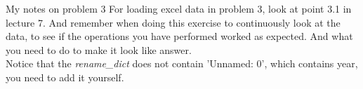 \documentclass[10pt,danish,t,10pt]{beamer}
\newcommand{\code}[1]{\textit{#1}} %
\begin{document}
\begin{frame}{My notes on problem 3}
    For loading excel data in problem 3, look at point 3.1 in lecture 7. And remember when doing this exercise to continuously look at the data, to see if the operations you have performed worked as expected. And what you need to do to make it look like answer. \\ 
    Notice that the \code{rename\_dict} does not contain 'Unnamed: 0', which contains year, you need to add it yourself.
    
\end{frame}
\end{document}
